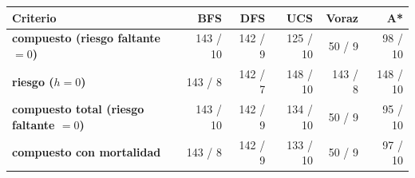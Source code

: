 \renewcommand{\arraystretch}{1.2}
\begin{tabular}{|l|r|r|r|r|r|}
\hline
\rowcolor{gray!20} \textbf{Criterio} & \textbf{BFS} & \textbf{DFS} & \textbf{UCS} & \textbf{Voraz} & \textbf{A*} \\
\hline
\textbf{compuesto (riesgo faltante $=0$)} & 143 / 10 & 142 / 9 & 125 / 10 & 50 / 9 & 98 / 10 \\
\hline
\textbf{riesgo ($h=0$)} & 143 / 8 & 142 / 7 & 148 / 10 & 143 / 8 & 148 / 10 \\
\hline
\textbf{compuesto total (riesgo faltante $=0$)} & 143 / 10 & 142 / 9 & 134 / 10 & 50 / 9 & 95 / 10 \\
\hline
\textbf{compuesto con mortalidad} & 143 / 8 & 142 / 9 & 133 / 10 & 50 / 9 & 97 / 10 \\
\hline
\end{tabular}
